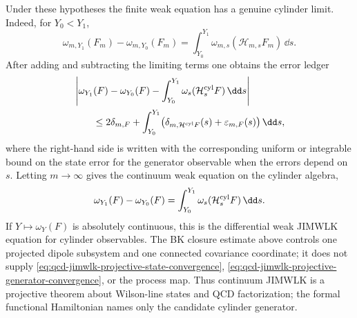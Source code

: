 Under these hypotheses the finite weak equation has a genuine cylinder
limit.  Indeed, for \(Y_0<Y_1\),
\[
  \omega_{m,Y_1}(F_m)-\omega_{m,Y_0}(F_m)
  =
  \int_{Y_0}^{Y_1}
  \omega_{m,s}(\mathcal H_{m,s}F_m)\,\dd s .
\]
After adding and subtracting the limiting terms one obtains the error ledger
\begin{equation}
\begin{aligned}
&
\left|
  \omega_{Y_1}(F)-\omega_{Y_0}(F)
  -
  \int_{Y_0}^{Y_1}
    \omega_s(\mathcal H^{\rm cyl}_sF)\,\dd s
\right|
\\
&\qquad\le
  2\delta_{m,F}
  +
  \int_{Y_0}^{Y_1}
  \bigl(
    \delta_{m,\mathcal H^{\rm cyl}F}(s)
    +
    \varepsilon_{m,F}(s)
  \bigr)\,\dd s ,
\end{aligned}
\label{eq:qcd-jimwlk-projective-weak-limit-budget}
\end{equation}
where the right-hand side is written with the corresponding uniform or
integrable bound on the state error for the generator observable when the
errors depend on \(s\).  Letting \(m\to\infty\)
gives the continuum weak equation on the cylinder algebra,
\[
  \omega_{Y_1}(F)-\omega_{Y_0}(F)
  =
  \int_{Y_0}^{Y_1}
    \omega_s(\mathcal H^{\rm cyl}_sF)\,\dd s .
\]
If \(Y\mapsto\omega_Y(F)\) is absolutely continuous, this is the
differential weak JIMWLK equation for cylinder observables.  The BK closure
estimate above controls one projected dipole subsystem and one connected
covariance coordinate; it does not supply
\eqref{eq:qcd-jimwlk-projective-state-convergence},
\eqref{eq:qcd-jimwlk-projective-generator-convergence}, or the process map.
Thus continuum JIMWLK is a projective theorem about Wilson-line states and
QCD factorization; the formal functional Hamiltonian names only the candidate
cylinder generator.

